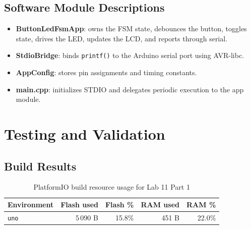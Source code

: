\documentclass[12pt]{article}
\begin{document}
\subsection{Software Module Descriptions}
\begin{itemize}
    \item \textbf{ButtonLedFsmApp}: owns the FSM state, debounces the button, toggles state, drives the LED, updates the LCD, and reports through serial.
    \item \textbf{StdioBridge}: binds \texttt{printf()} to the Arduino serial port using AVR-libc.
    \item \textbf{AppConfig}: stores pin assignments and timing constants.
    \item \textbf{main.cpp}: initializes STDIO and delegates periodic execution to the app module.
\end{itemize}

\section{Testing and Validation}

\subsection{Build Results}
\begin{table}[H]
\centering
\begin{tabular}{lrrrr}
\toprule
\textbf{Environment} & \textbf{Flash used} & \textbf{Flash \%} & \textbf{RAM used} & \textbf{RAM \%} \\
\midrule
\texttt{uno} & 5\,090 B & 15.8\% & 451 B & 22.0\% \\
\bottomrule
\end{tabular}
\caption{PlatformIO build resource usage for Lab 11 Part 1}
\label{tab:build}
\end{table}
\end{document}
